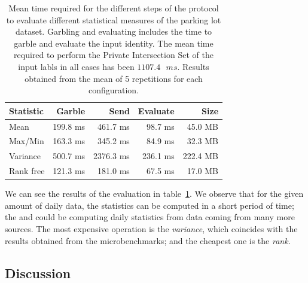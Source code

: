 \begin{table}
    \begin{tabular}{l*{3}{r}r}
    \textbf{Statistic}  & \textbf{Garble} & \textbf{Send} & \textbf{Evaluate} & \textbf{Size} \\
    \hline
    Mean       & 199.8 ms & 461.7 ms & 98.7  ms & 45.0 MB \\
    Max/Min    & 163.3 ms & 345.2 ms & 84.9  ms & 32.3 MB \\
    Variance   & 500.7 ms & 2376.3 ms & 236.1 ms & 222.4 MB \\
    \hline
    Rank free  & 121.3 ms & 181.0 ms & 67.5 ms & 17.0 MB \\
    \end{tabular}
    \caption{Mean time required for the different steps of the protocol to
      evaluate different statistical measures of the parking lot dataset.
      Garbling and evaluating includes the time to garble and evaluate the
      input identity.  The mean time required to perform the Private
      Intersection Set of the input labls in all cases has been 
      \mbox{$1107.4 \text{ } ms$}.  Results obtained from the mean of 5 repetitions for
      each configuration.}
    \label{stats-times}
\end{table}

We can see the results of the evaluation in table~\ref{stats-times}.  We
observe that for the given amount of daily data, the statistics can be computed
in a short period of time; the \broker and \garbler could be computing daily
statistics from data coming from many more sources.  The most expensive
operation is the \emph{variance}, which coincides with the results obtained
from the microbenchmarks; and the cheapest one is the \emph{rank}.




\subsection{Discussion}

